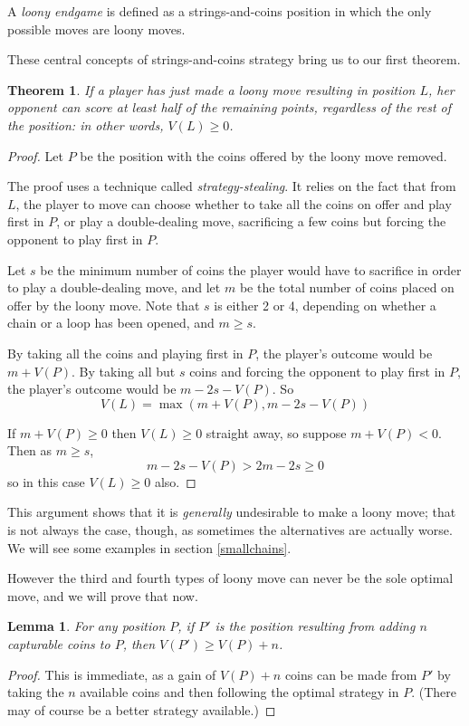 \documentclass[a4paper,twocolumn]{article}
\newtheorem{sstealing}[thm]{Theorem}
\newtheorem{addcoins}[thm]{Lemma}
\begin{document}
A \emph{loony endgame} is defined as a strings-and-coins position in
which the only possible moves are loony moves.

These central concepts of strings-and-coins strategy bring us to our
first theorem.

\begin{sstealing} \label{sstealing}
  If a player has just made a loony move resulting in position $L$,
  her opponent can score at least half of the remaining points,
  regardless of the rest of the position: in other words, $V(L) \ge
  0$.
\end{sstealing}

\begin{proof}
  Let $P$ be the position with the coins offered by the loony move
  removed.

  The proof uses a technique called \emph{strategy-stealing}. It
  relies on the fact that from $L$, the player to move can choose
  whether to take all the coins on offer and play first in $P$, or
  play a double-dealing move, sacrificing a few coins but forcing the
  opponent to play first in $P$.

  Let $s$ be the minimum number of coins the player would have to
  sacrifice in order to play a double-dealing move, and let $m$ be the
  total number of coins placed on offer by the loony move. Note that
  $s$ is either 2 or 4, depending on whether a chain or a loop has
  been opened, and $m \ge s$.

  By taking all the coins and playing first in $P$, the player's
  outcome would be $m + V(P)$. By taking all but $s$ coins and forcing
  the opponent to play first in $P$, the player's outcome would be
  $m-2s-V(P)$. So $$V(L) = \max(m+V(P), m-2s-V(P))$$

  If $m+V(P) \ge 0$ then $V(L) \ge 0$ straight away, so suppose
  $m+V(P) < 0$. Then as $m \ge s$, $$m-2s-V(P) > 2m-2s \ge 0$$ so in
  this case $V(L) \ge 0$ also.
\end{proof}

This argument shows that it is \emph{generally} undesirable to make a
loony move; that is not always the case, though, as sometimes the
alternatives are actually worse. We will see some examples in section
\ref{smallchains}.

However the third and fourth types of loony move can never be the sole
optimal move, and we will prove that now.

\begin{addcoins}\label{addcoins}
  For any position $P$, if $P'$ is the position resulting from adding
  $n$ capturable coins to $P$, then $V(P') \ge V(P)+n$.
\end{addcoins}
\begin{proof}
  This is immediate, as a gain of $V(P)+n$ coins can be made from $P'$
  by taking the $n$ available coins and then following the optimal
  strategy in $P$. (There may of course be a better strategy
  available.)
\end{proof}
\end{document}
